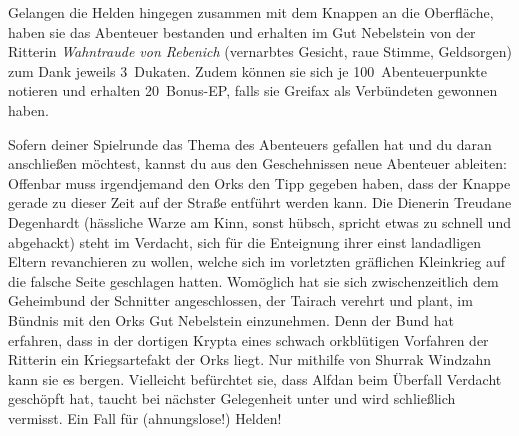Gelangen die Helden hingegen zusammen mit dem Knappen an die Oberfläche, haben sie das Abenteuer bestanden und erhalten im Gut Nebelstein von der Ritterin \textit{Wahntraude von Rebenich} (vernarbtes Gesicht, raue Stimme, Geldsorgen) zum Dank jeweils 3~Dukaten. Zudem können sie sich je 100~Abenteuerpunkte notieren und erhalten 20~Bonus-EP, falls sie Greifax als Verbündeten gewonnen haben.



Sofern deiner Spielrunde das Thema des Abenteuers gefallen hat und du daran anschließen möchtest, kannst du aus den Geschehnissen neue Abenteuer ableiten:
Offenbar muss irgendjemand den Orks den Tipp gegeben haben, dass der Knappe gerade zu dieser Zeit auf der Straße entführt werden kann.
Die Dienerin Treudane Degenhardt (hässliche Warze am Kinn, sonst hübsch, spricht etwas zu schnell und abgehackt) steht im Verdacht, sich für die Enteignung ihrer einst landadligen Eltern revanchieren zu wollen, welche sich im vorletzten gräflichen Kleinkrieg auf die falsche Seite geschlagen hatten.
Womöglich hat sie sich zwischenzeitlich dem Geheimbund der Schnitter angeschlossen, der Tairach verehrt und plant, im Bündnis mit den Orks Gut Nebelstein einzunehmen.
Denn der Bund hat erfahren, dass in der dortigen Krypta eines schwach orkblütigen Vorfahren der Ritterin ein Kriegsartefakt der Orks liegt.
Nur mithilfe von Shurrak Windzahn kann sie es bergen. Vielleicht befürchtet sie, dass Alfdan beim Überfall Verdacht geschöpft hat, taucht bei nächster Gelegenheit unter und wird schließlich vermisst. Ein Fall für (ahnungslose!) Helden!


\spaltenende

